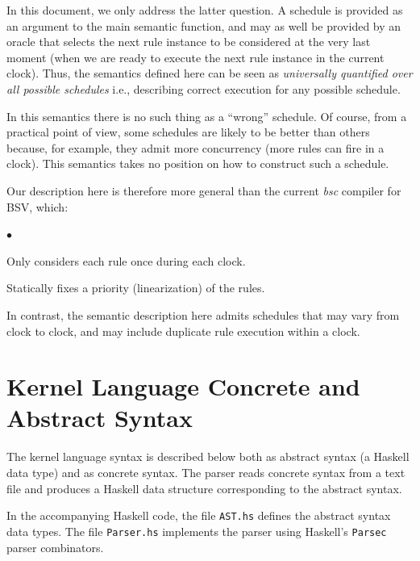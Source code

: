 \documentclass[11pt]{article}
\newenvironment{tightlist}%
{\begin{list}{$\bullet$}{%
    \setlength{\topsep}{0in}
    \setlength{\partopsep}{0in}
    \setlength{\itemsep}{0in}
    \setlength{\parsep}{0in}
    \setlength{\leftmargin}{1.5em}
    \setlength{\rightmargin}{0in}
    \setlength{\itemindent}{0in}
}
}%
{\end{list}
}
\newcommand{\term}[1]{\texttt{#1}}
\begin{document}
In this document, we only address the latter question.  A schedule is
provided as an argument to the main semantic function, and may as well
be provided by an oracle that selects the next rule instance to be
considered at the very last moment (when we are ready to execute the
next rule instance in the current clock).  Thus, the semantics defined
here can be seen as \emph{universally quantified over all possible
schedules} i.e., describing correct execution for any possible
schedule.

In this semantics there is no such thing as a ``wrong'' schedule.  Of
course, from a practical point of view, some schedules are likely to
be better than others because, for example, they admit more
concurrency (more rules can fire in a clock).  This semantics takes no
position on how to construct such a schedule.

Our description here is therefore more general than the current
\emph{bsc} compiler for BSV, which:

\begin{tightlist}

\item Only considers each rule once during each clock.

\item Statically fixes a priority (linearization) of the rules.

\end{tightlist}

In contrast, the semantic description here admits schedules that may
vary from clock to clock, and may include duplicate rule execution
within a clock.


\section{Kernel Language Concrete and Abstract Syntax}

\label{sec_syntax}

The kernel language syntax is described below both as abstract syntax
(a Haskell data type) and as concrete syntax.  The parser reads concrete syntax from
a text file and produces a Haskell data structure corresponding to the
abstract syntax.

In the accompanying Haskell code, the file {\tt AST.hs} defines the
abstract syntax data types.  The file {\tt Parser.hs} implements the
parser using Haskell's \term{Parsec} parser combinators.
\end{document}
